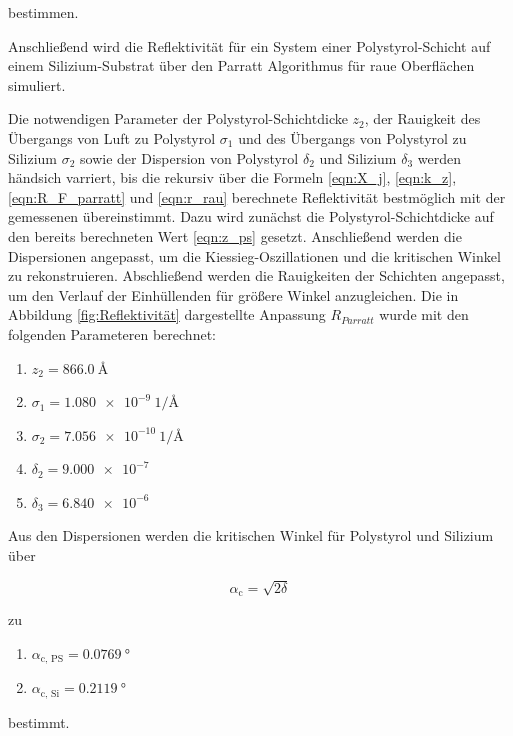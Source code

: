     bestimmen.

    Anschließend wird die Reflektivität für ein System einer Polystyrol-Schicht auf einem Silizium-Substrat über den Parratt Algorithmus für raue Oberflächen simuliert.
    
    
    Die notwendigen Parameter der Polystyrol-Schichtdicke $z_2$, der Rauigkeit des Übergangs von Luft zu Polystyrol $\sigma_1$ und des Übergangs von Polystyrol zu Silizium $\sigma_2$ sowie der Dispersion von
    Polystyrol $\delta_2$ und Silizium $\delta_3$ werden händsich varriert, bis die rekursiv über die Formeln \ref{eqn:X_j}, \ref{eqn:k_z}, \ref{eqn:R_F_parratt} und \ref{eqn:r_rau} berechnete Reflektivität 
    bestmöglich mit der gemessenen übereinstimmt. Dazu wird 
    zunächst die Polystyrol-Schichtdicke auf den bereits berechneten Wert \ref{eqn:z_ps} gesetzt. Anschließend werden die Dispersionen angepasst, um die Kiessieg-Oszillationen und die kritischen Winkel
    zu rekonstruieren. Abschließend werden die Rauigkeiten der Schichten angepasst, um den Verlauf der Einhüllenden für größere Winkel anzugleichen. Die in Abbildung \ref{fig:Reflektivität} dargestellte 
    Anpassung $R_{Parratt}$ wurde mit den folgenden Parameteren berechnet:
    
    \begin{enumerate}
      \item $z_2=\SI{866.0}{\angstrom}$
      \item $\sigma_1=\SI{1.080e-9}{1\per\angstrom}$
      \item $\sigma_2=\SI{7.056e-10}{1\per\angstrom}$
      \item $\delta_2=\SI{9.000e-7}{}$
      \item $\delta_3=\SI{6.840e-6}{}$
    \end{enumerate}

    Aus den Dispersionen werden die kritischen Winkel für Polystyrol und Silizium über

    \begin{equation*}
      \alpha_{\text{c}} = \sqrt{2\delta}
    \end{equation*}

    zu

    \begin{enumerate}
      \item $\alpha_{\text{c, PS}} = \SI{0.0769}{\degree}$
      \item $\alpha_{\text{c, Si}} = \SI{0.2119}{\degree}$
    \end{enumerate}
    
    bestimmt.